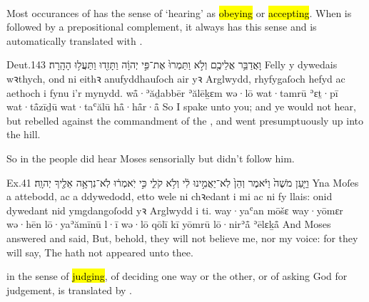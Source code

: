 \paragraph{}


\begin{paper}
	Most occurances of  has the sense of ‘hearing’ as \hl{obeying} or \hl{accepting}. When  is followed by a prepositional complement, it always has this sense and is automatically translated with .
\end{paper}

\begin{example}{Deut.}{1}{43}{}{}
	\quoling
	{וָאֲדַבֵּ֥ר אֲלֵיכֶ֖ם וְלֹ֣א  וַתַּמְרוּ֙ אֶת־פִּ֣י יְהוָ֔ה וַתָּזִ֖דוּ וַתַּעֲל֥וּ הָהָֽרָה׃}
	{Felly y dywedais wꝛthych, ond ni  eithꝛ anufyddhauſoch air yꝛ Arglwydd, rhyfygaſoch hefyd ac aethoch i fynu i’r mynydd.}
	{wå̄·ʾăḏabbēr ʾălēḵɛm wə·lō  wat·tamrū ʾɛṯ·pī {\YHWH} wat·tå̄zīḏū wat·taʿălū hå̄·hå̄r·å̄}
	{So I spake unto you; and ye would not hear, but rebelled against the commandment of the {\LORD}, and went presumptuously up into the hill.}
\end{example}
\begin{paper}
	So in  the people did hear Moses sensorially but didn’t follow him.
\end{paper}

\begin{example}{Ex.}{4}{1}{}{}
	\quoling
	{וַיַּ֤עַן מֹשֶׁה֙ וַיֹּ֔אמֶר וְהֵן֙ לֹֽא־יַאֲמִ֣ינוּ לִ֔י וְלֹ֥א  קֹלִ֑י כִּ֣י יֹֽאמְר֔וּ לֹֽא־נִרְאָ֥ה אֵלֶ֖יךָ יְהוָֽה׃}
	{Yna Moſes a attebodd, ac a ddywedodd, etto wele ni chꝛedant i mi ac ni   fy llais: onid dywedant nid ymgdangoſodd yꝛ Arglwydd i ti.}
	{way·yaʿan mōšɛ way·yōmɛr wə·hēn lō·yaʾămīnū l·ī wə·lō  qōlī kī yōmrū lō·nirʾå̄ ʾēlɛḵå̄ {\YHWH}}
	{And Moses answered and said, But, behold, they will not believe me, nor   my voice: for they will say, The {\LORD} hath not appeared unto thee.}
\end{example}





\begin{paper}
	{\click}  in the sense of \hl{judging}, of deciding one way or the other, or of asking God for judgement, is translated by .
\end{paper}

